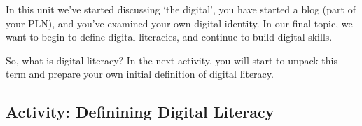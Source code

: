 \documentclass[
]{book}
\theoremstyle{definition}
\theoremstyle{definition}
\theoremstyle{definition}
\theoremstyle{definition}
\theoremstyle{remark}
\begin{document}
In this unit we've started discussing `the digital', you have started a blog (part of your PLN), and you've examined your own digital identity. In our final topic, we want to begin to define digital literacies, and continue to build digital skills.

So, what is digital literacy? In the next activity, you will start to unpack this term and prepare your own initial definition of digital literacy.

\hypertarget{activity-definining-digital-literacy}{%
\subsection*{Activity: Definining Digital Literacy}\label{activity-definining-digital-literacy}}
\end{document}
